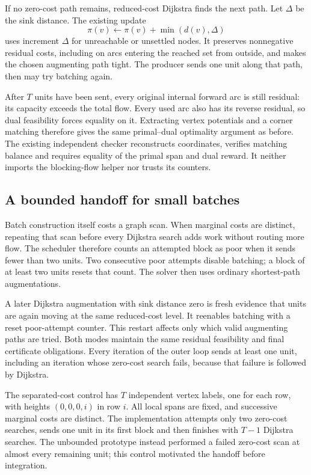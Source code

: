 If no zero-cost path remains, reduced-cost Dijkstra finds the next path.
Let $\Delta$ be the sink distance. The existing update
\[
 \pi(v)\gets\pi(v)+\min(d(v),\Delta)
\]
uses increment $\Delta$ for unreachable or unsettled nodes. It preserves
nonnegative residual costs, including on arcs entering the reached set
from outside, and makes the chosen augmenting path tight. The producer
sends one unit along that path, then may try batching again.

After $T$ units have been sent, every original internal forward arc is
still residual: its capacity exceeds the total flow. Every used arc also
has its reverse residual, so dual feasibility forces equality on it.
Extracting vertex potentials and a corner matching therefore gives the
same primal--dual optimality argument as before. The existing independent
checker reconstructs coordinates, verifies matching balance and requires
equality of the primal span and dual reward. It neither imports the
blocking-flow helper nor trusts its counters.

\subsection{A bounded handoff for small batches}

Batch construction itself costs a graph scan. When marginal costs are
distinct, repeating that scan before every Dijkstra search adds work
without routing more flow. The scheduler therefore counts an attempted
block as poor when it sends fewer than two units. Two consecutive poor
attempts disable batching; a block of at least two units resets that count.
The solver then uses ordinary shortest-path augmentations.

A later Dijkstra augmentation with sink distance zero is fresh evidence
that units are again moving at the same reduced-cost level. It reenables
batching with a reset poor-attempt counter. This restart affects only
which valid augmenting paths are tried. Both modes maintain the same
residual feasibility and final certificate obligations. Every iteration
of the outer loop sends at least one unit, including an iteration whose
zero-cost search fails, because that failure is followed by Dijkstra.

The separated-cost control has $T$ independent vertex labels, one for
each row, with heights $(0,0,0,i)$ in row $i$. All local spans are fixed,
and successive marginal costs are distinct. The implementation attempts
only two zero-cost searches, sends one unit in its first block and then
finishes with $T-1$ Dijkstra searches. The unbounded prototype instead
performed a failed zero-cost scan at almost every remaining unit; this
control motivated the handoff before integration.

